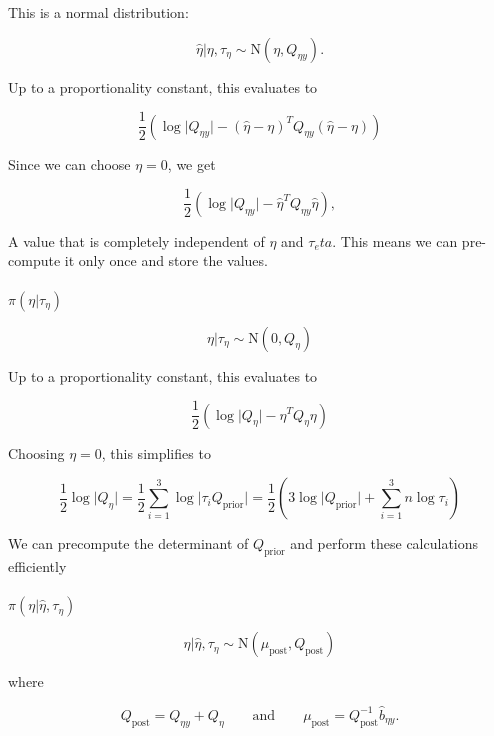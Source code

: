 \documentclass[
  letterpaper,
  DIV=11,
  numbers=noendperiod]{scrartcl}
\makeatletter
\let\oldparagraph\paragraph
\renewcommand{\paragraph}{
    \@ifstar
      \xxxParagraphStar
      \xxxParagraphNoStar
  }
\newcommand{\xxxParagraphStar}[1]{\oldparagraph*{#1}\mbox{}}
\newcommand{\xxxParagraphNoStar}[1]{\oldparagraph{#1}\mbox{}}
\makeatother
\begin{document}
This is a normal distribution:

\[
\hat\eta\vert\eta, \tau_\eta \sim \mathrm{N}(\eta, Q_{\eta y}).
\]

Up to a proportionality constant, this evaluates to

\[
\frac12 \left(\log\vert Q_{\eta y}\vert - (\hat \eta - \eta)^TQ_{\eta y}(\hat \eta - \eta)\right)
\]

Since we can choose \(\eta = 0\), we get

\[
\frac12 \left(\log\vert Q_{\eta y}\vert - \hat \eta^TQ_{\eta y}\hat \eta\right),
\]

A value that is completely independent of \(\eta\) and \(\tau_eta\).
This means we can pre-compute it only once and store the values.

\paragraph{\texorpdfstring{\(\pi(\eta \vert \tau_\eta)\)}{\textbackslash pi(\textbackslash eta \textbackslash vert \textbackslash tau\_\textbackslash eta)}}\label{pieta-vert-tau_eta}

\[
\eta \vert \tau_\eta \sim \mathrm{N}(0, Q_\eta)
\]

Up to a proportionality constant, this evaluates to

\[
\frac12\left(\log\vert Q_\eta\vert - \eta^TQ_\eta\eta\right)
\]

Choosing \(\eta = 0\), this simplifies to

\[
\frac12\log\vert Q_\eta\vert = \frac12  \sum_{i=1}^3\log\vert \tau_i Q_\text{prior}\vert =
\frac12  \left(3 \log\vert Q_\text{prior}\vert + \sum_{i=1}^3 n\log \tau_i\right)
\]

We can precompute the determinant of \(Q_\text{prior}\) and perform
these calculations efficiently

\paragraph{\texorpdfstring{\(\pi(\eta \vert \hat \eta, \tau_\eta)\)}{\textbackslash pi(\textbackslash eta \textbackslash vert \textbackslash hat \textbackslash eta, \textbackslash tau\_\textbackslash eta)}}\label{pieta-vert-hat-eta-tau_eta}

\[
\eta \vert \hat\eta, \tau_\eta \sim \mathrm{N}(\mu_\text{post}, Q_\text{post})
\]

where

\[
Q_{\text{post}} = Q_{\eta y} + Q_\eta
\qquad
\text{and}
\qquad
\mu_{\text{post}} = Q_{\text{post}}^{-1}\hat b_{\eta y}.
\]
\end{document}
